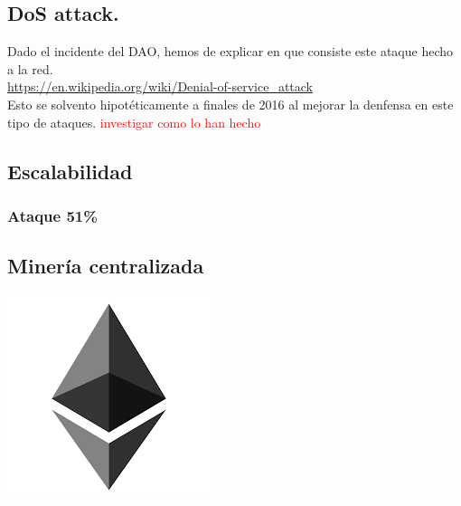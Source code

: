 \documentclass[11pt,a4paper]{article}
\begin{document}
\subsection{DoS attack.}
Dado el incidente del DAO, hemos de explicar en que consiste este ataque hecho a la red.		 \\
\url{https://en.wikipedia.org/wiki/Denial-of-service_attack}\\
Esto se solvento hipotéticamente a finales de 2016 al mejorar la denfensa en este tipo de ataques. \textcolor{red}{investigar como lo han hecho}

\subsection{Escalabilidad}
\label{sec:escalabilidad}

\subsubsection{Ataque 51\%}
\subsection{Minería centralizada}

\newpage
\begin{center}
  \includegraphics[scale=.42]{images/logo.png}
\end{center}

\tableofcontents
\end{document}
